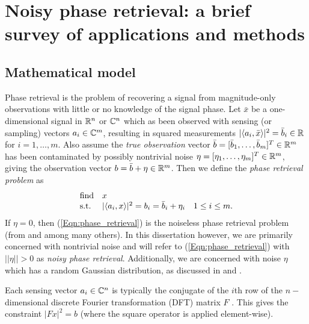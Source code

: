 \chapter{Noisy phase retrieval: a brief survey of applications and methods} 	\label{Sec:phase_retrieval}


\section{Mathematical model}	\label{Subsec:phase_retrieval-math_model}



Phase retrieval is the problem of recovering a signal from magnitude-only observations with little or no knowledge of the signal phase.  Let $\bar{x}$ be a one-dimensional signal in ${\mathbb R}^n$ or ${\mathbb C}^n$ which as been observed with sensing (or sampling) vectors $a_i \in {\mathbb C}^m$, resulting in squared measurements $|\langle a_i, \bar{x} \rangle |^2 = \bar{b}_i \in {\mathbb R}$ for $i = 1, \ldots, m$.  Also assume the \textit{true observation} vector $\bar{b} = [\bar{b}_1, \ldots, \bar{b}_m]^T \in {\mathbb R}^m$ has been contaminated by possibly nontrivial noise $\eta = [\eta_1, \ldots, \eta_m]^T \in {\mathbb R}^m$, giving the observation vector $b = \bar{b} + \eta \in {\mathbb R}^m$.  Then we define the \textit{phase retrieval problem} as
\begin{equation} \label{Eqn:phase_retrieval}
\begin{array}{lll}
\textnormal{find}		&	x		\\
\textnormal{s.t.}				&	|\langle a_i, x \rangle|^2 = b_i = \bar{b}_i + \eta_i	&	1 \leq i \leq m.
\end{array}
\end{equation}
If $\eta = 0$, then (\ref{Eqn:phase_retrieval}) is the noiseless phase retrieval problem (from \cite{Fienup82} and  \cite{DBLP:journals/tit/CandesLS15} among many others).  In this dissertation however, we are primarily concerned with nontrivial noise and will refer to (\ref{Eqn:phase_retrieval}) with $||\eta|| > 0$ as \textit{noisy phase retrieval}.  Additionally, we are concerned with noise $\eta$ which has a random Gaussian distribution, as discussed in \cite{DBLP:journals/siamis/CandesESV13} and \cite{DBLP:journals/siamsc/FriedlanderM16}.


Each sensing vector $a_i \in {\mathbb C}^n$ is typically the conjugate of the $i$th row of the $n-$dimensional discrete Fourier transformation (DFT) matrix $F$ \cite[Chapter 11]{bracewell1986fourier}.  This gives the constraint $|Fx|^2 = b$ (where the square operator is applied element-wise).  


